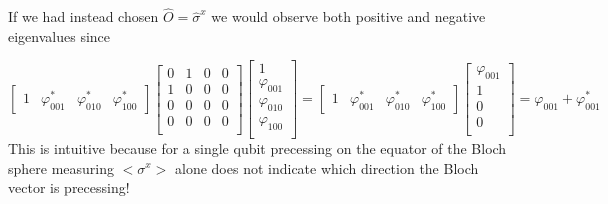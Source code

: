 If we had instead chosen  $\hat{O} = \hat{\sigma}^x$ we would observe both positive and negative eigenvalues since

\begin{equation}
    \begin{bmatrix}
        1 & \varphi_{001}^* & \varphi_{010}^* & \varphi_{100}^{*}
    \end{bmatrix}
    \begin{bmatrix}
        0 & 1 & 0 & 0 \\
        1 & 0 & 0 & 0 \\
        0 & 0 & 0 & 0 \\
        0 & 0 & 0 & 0 \\
    \end{bmatrix}
    \begin{bmatrix}
        1 \\
        \varphi_{001} \\
        \varphi_{010} \\
        \varphi_{100} \\
    \end{bmatrix}
    =
    \begin{bmatrix}
        1 & \varphi_{001}^* & \varphi_{010}^* & \varphi_{100}^*
    \end{bmatrix}
    \begin{bmatrix}
         \varphi_{001}\\
        1 \\
        0 \\
        0 \\
    \end{bmatrix}
    =  \varphi_{001} + \varphi_{001}^*
\end{equation}
This is intuitive because for a single qubit precessing on the equator of the Bloch sphere measuring $<\sigma^x>$ alone does not indicate which direction the Bloch vector is precessing!

